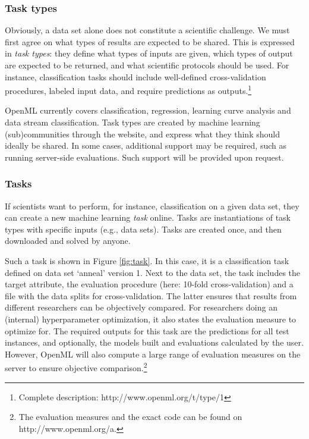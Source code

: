\documentclass{acmproc-sp}
\begin{document}
\subsubsection{Task types}
Obviously, a data set alone does not constitute a scientific challenge. We must first agree on what types of results are expected to be shared. This is expressed in \textit{task types}: they define what types of inputs are given, which types of output are expected to be returned, and what scientific protocols should be used. For instance, classification tasks should include well-defined cross-validation procedures, labeled input data, and require predictions as outputs.\footnote{Complete description: http://www.openml.org/t/type/1}

OpenML currently covers classification, regression, learning curve analysis and data stream classification. Task types are created by machine learning (sub)communities through the website, and express what they think should ideally be shared. In some cases, additional support may be required, such as running server-side evaluations. Such support will be provided upon request.
 
\subsubsection{Tasks}
If scientists want to perform, for instance, classification on a given data set, they can create a new machine learning \textit{task} online. Tasks are instantiations of task types with specific inputs (e.g., data sets). Tasks are created once, and then downloaded and solved by anyone. 

Such a task is shown in Figure \ref{fig:task}. In this case, it is a classification task defined on data set `anneal' version 1. Next to the data set, the task includes the target attribute, the evaluation procedure (here: 10-fold cross-validation) and a file with the data splits for cross-validation. The latter ensures that results from different researchers can be objectively compared. For researchers doing an (internal) hyperparameter optimization, it also states the evaluation measure to optimize for. The required outputs for this task are the predictions for all test instances, and optionally, the models built and evaluations calculated by the user. However, OpenML will also compute a large range of evaluation measures on the server to ensure objective comparison.\footnote{The evaluation measures and the exact code can be found on http://www.openml.org/a.}
\end{document}
